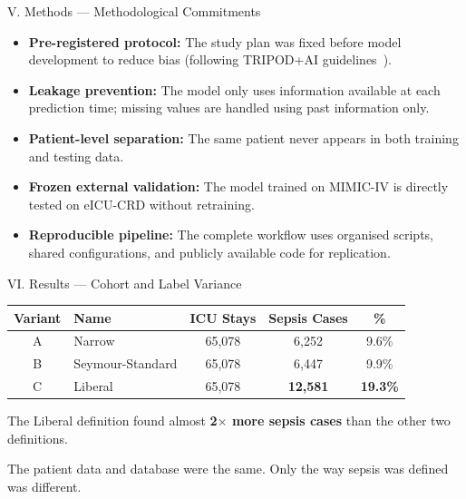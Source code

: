 \documentclass[aspectratio=169,10pt]{beamer}
\newcommand{\tablestyle}{%
  \renewcommand{\arraystretch}{1.2}%
  \small%
}
\begin{document}
\begin{frame}{V. Methods --- Methodological Commitments}
\begin{itemize}
  \item \textbf{Pre-registered protocol:} The study plan was fixed before model development to reduce bias (following TRIPOD+AI guidelines~\cite{collins2024tripodai}).
  \item \textbf{Leakage prevention:} The model only uses information available at each prediction time; missing values are handled using past information only.
  \item \textbf{Patient-level separation:} The same patient never appears in both training and testing data.
  \item \textbf{Frozen external validation:} The model trained on MIMIC-IV is directly tested on eICU-CRD without retraining.
  \item \textbf{Reproducible pipeline:} The complete workflow uses organised scripts, shared configurations, and publicly available code for replication.
\end{itemize}
\end{frame}

\begin{frame}{VI. Results --- Cohort and Label Variance}
\begin{center}
\tablestyle
\begin{tabular}{clccc}
\toprule
\textbf{Variant} & \textbf{Name} & \textbf{ICU Stays} & \textbf{Sepsis Cases} & \textbf{\%} \\
\midrule
A & Narrow           & 65,078 & 6,252        & 9.6\% \\
B & Seymour-Standard & 65,078 & 6,447        & 9.9\% \\
C & Liberal          & 65,078 & \textbf{12,581} & \textbf{19.3\%} \\
\bottomrule
\end{tabular}
\end{center}

\vspace{8pt}
The Liberal definition found almost \textbf{2$\times$ more sepsis cases} than the other two definitions.

\vspace{4pt}
The patient data and database were the same. Only the way sepsis was defined was different.
\end{frame}
\end{document}
